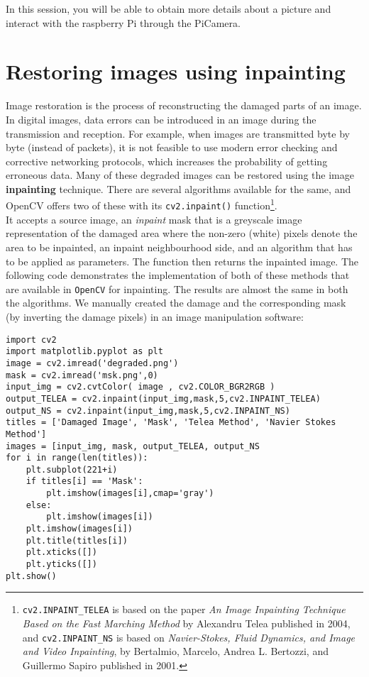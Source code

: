 \documentclass{labo}
\author{}
\newcommand{\opencv}{\texttt{OpenCV} }
\begin{document}

In this session, you will be able to obtain more details about a picture and interact with the raspberry Pi through the PiCamera.

\section*{Restoring images using inpainting}
Image restoration is the process of reconstructing the damaged parts of an image. In digital images, data errors can be introduced in an image during the transmission and reception. For example, when images are transmitted byte by byte (instead of packets), it is not feasible to use modern error checking and corrective networking protocols, which increases the probability of getting erroneous data. Many of these degraded images can be restored using the image \textbf{inpainting} technique. There are several algorithms available for the same, and OpenCV offers two of these with its \texttt{cv2.inpaint()} function\footnote{\texttt{cv2.INPAINT\_TELEA} is based on the paper \textit{An Image Inpainting Technique Based on the Fast Marching Method} by Alexandru Telea published in 2004, and \texttt{cv2.INPAINT\_NS} is based on \textit{Navier-Stokes, Fluid Dynamics, and Image and Video Inpainting}, by Bertalmio, Marcelo, Andrea L. Bertozzi, and Guillermo Sapiro published in 2001.}.\\

It accepts a source image, an \textit{inpaint} mask that is a greyscale image representation of the damaged area where the non-zero (white) pixels denote the area to be inpainted, an inpaint neighbourhood side, and an algorithm that has to be applied as parameters. The function then returns the inpainted image. The following code demonstrates the implementation of both of these methods that are available in \opencv for inpainting. The results are almost the same in both the algorithms. We manually created the damage and the corresponding mask (by inverting the damage pixels) in an image manipulation software:

\begin{verbatim}
import cv2 
import matplotlib.pyplot as plt 
image = cv2.imread('degraded.png') 
mask = cv2.imread('msk.png',0) 
input_img = cv2.cvtColor( image , cv2.COLOR_BGR2RGB ) 
output_TELEA = cv2.inpaint(input_img,mask,5,cv2.INPAINT_TELEA) 
output_NS = cv2.inpaint(input_img,mask,5,cv2.INPAINT_NS) 
titles = ['Damaged Image', 'Mask', 'Telea Method', 'Navier Stokes Method']
images = [input_img, mask, output_TELEA, output_NS
for i in range(len(titles)):
	plt.subplot(221+i)
	if titles[i] == 'Mask':
		plt.imshow(images[i],cmap='gray')
	else:
		plt.imshow(images[i])
	plt.imshow(images[i])
	plt.title(titles[i])
	plt.xticks([])
	plt.yticks([]) 
plt.show()
\end{verbatim}
\end{document}
